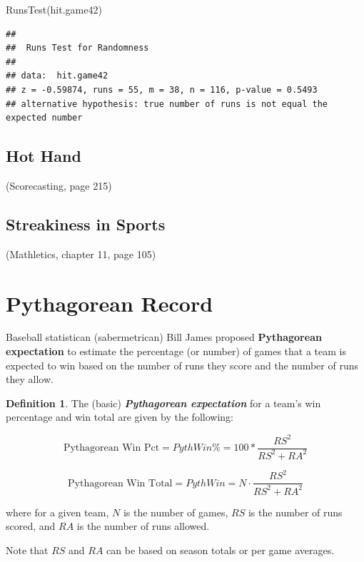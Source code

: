 \documentclass[
  11pt,
]{book}
\newenvironment{Shaded}{\begin{snugshade}}{\end{snugshade}}
\newcommand{\FunctionTok}[1]{\textcolor[rgb]{0.00,0.00,0.00}{#1}}
\newcommand{\NormalTok}[1]{#1}
\theoremstyle{definition}
\newtheorem{definition}{Definition}[chapter]
\theoremstyle{definition}
\theoremstyle{definition}
\theoremstyle{definition}
\theoremstyle{remark}
\begin{document}
\vfill

\begin{Shaded}
\begin{Highlighting}[]
\FunctionTok{RunsTest}\NormalTok{(hit.game42)}
\end{Highlighting}
\end{Shaded}

\begin{verbatim}
## 
##  Runs Test for Randomness
## 
## data:  hit.game42
## z = -0.59874, runs = 55, m = 38, n = 116, p-value = 0.5493
## alternative hypothesis: true number of runs is not equal the expected number
\end{verbatim}

\vfill

\newpage

\hypertarget{hot-hand}{%
\subsection{Hot Hand}\label{hot-hand}}

(Scorecasting, page 215)

\hypertarget{streakiness-in-sports}{%
\subsection{Streakiness in Sports}\label{streakiness-in-sports}}

(Mathletics, chapter 11, page 105)

\newpage

\hypertarget{pythagorean-record}{%
\section{Pythagorean Record}\label{pythagorean-record}}

Baseball statistican (sabermetrican) Bill James proposed \textbf{Pythagorean expectation} to estimate the percentage (or number) of games that a team is expected to win based on the number of runs they score and the number of runs they allow.

\begin{definition}
The (basic) \textbf{\emph{Pythagorean expectation}} for a team's win percentage and win total are given by the following:

\[\text{Pythagorean Win Pct} = PythWin\% = 100 * \frac{RS^2}{RS^2 + RA^2}\]

\[\text{Pythagorean Win Total} = PythWin = N \cdot \frac{RS^2}{RS^2 + RA^2}\]

where for a given team, \(N\) is the number of games, \(RS\) is the number of runs scored, and \(RA\) is the number of runs allowed.

Note that \(RS\) and \(RA\) can be based on season totals or per game averages.
\end{definition}
\end{document}
